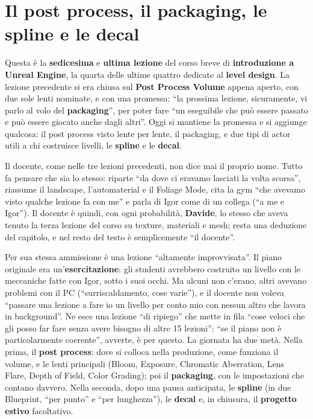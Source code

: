 \chapter[Post process, packaging, spline e decal]{Il post process, il packaging, le
spline e le decal}
\label{ue16:cap:ultima}

Questa è la \textbf{sedicesima} e \textbf{ultima lezione} del corso breve di
\textbf{introduzione a Unreal Engine}, la quarta delle ultime quattro dedicate al
\textbf{level design}. La lezione precedente si era chiusa sul \textbf{Post Process Volume}
appena aperto, con due sole lenti nominate, e con una promessa: ``la prossima lezione,
sicuramente, vi parlo al volo del \textbf{packaging}'', per poter fare ``un eseguibile che
può essere passato e può essere giocato anche dagli altri''. Oggi si mantiene la promessa e
si aggiunge qualcosa: il post process visto lente per lente, il packaging, e due tipi di
actor utili a chi costruisce livelli, le \textbf{spline} e le \textbf{decal}.

Il docente, come nelle tre lezioni precedenti, non dice mai il proprio nome. Tutto fa pensare
che sia lo stesso: riparte ``da dove ci eravamo lasciati la volta scorsa'', riassume il
landscape, l'automaterial e il Foliage Mode, cita la gym ``che avevamo visto qualche lezione
fa con me'' e parla di Igor come di un collega (``a me e Igor''). Il docente è quindi, con
ogni probabilità, \textbf{Davide}, lo stesso che aveva tenuto la terza lezione del corso su
texture, materiali e mesh; resta una deduzione del capitolo, e nel resto del testo è
semplicemente ``il docente''.

Per sua stessa ammissione è una lezione ``altamente improvvisata''. Il piano originale era
un'\textbf{esercitazione}: gli studenti avrebbero costruito un livello con le meccaniche
fatte con Igor, sotto i suoi occhi. Ma alcuni non c'erano, altri avevano problemi con il PC
(``surriscaldamento, cose varie''), e il docente non voleva ``passare una lezione a fare io un
livello per conto mio con nessun altro che lavora in background''. Ne esce una lezione
``di ripiego'' che mette in fila ``cose veloci che gli posso far fare senza avere bisogno di
altre 15 lezioni'': ``se il piano non è particolarmente coerente'', avverte, è per questo.
La giornata ha due metà. Nella prima, il \textbf{post process}: dove si colloca nella
produzione, come funziona il volume, e le lenti principali (Bloom, Exposure, Chromatic
Aberration, Lens Flare, Depth of Field, Color Grading); poi il \textbf{packaging}, con le
impostazioni che contano davvero. Nella seconda, dopo una pausa anticipata, le
\textbf{spline} (in due Blueprint, ``per punto'' e ``per lunghezza''), le \textbf{decal} e,
in chiusura, il \textbf{progetto estivo} facoltativo.

